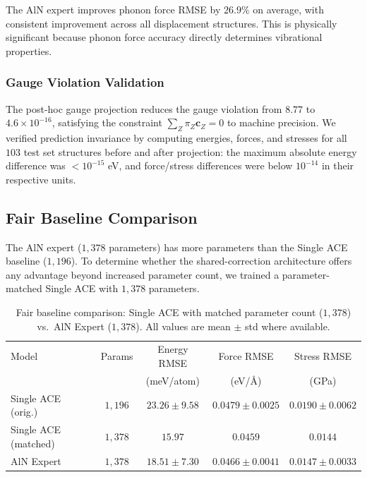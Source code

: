 \documentclass[twoside,prb,aps,floatfix,superscriptaddress,longbibliography]{revtex4-2}
\newcommand{\AAng}{\mbox{\AA}}
\newcommand{\cZ}{\mathbf{c}_{Z}}
\begin{document}
The AlN expert improves phonon force RMSE by $26.9\%$ on average, with consistent improvement across all displacement structures. This is physically significant because phonon force accuracy directly determines vibrational properties.

\subsubsection{Gauge Violation Validation}

The post-hoc gauge projection reduces the gauge violation from $8.77$ to $4.6 \times 10^{-16}$, satisfying the constraint $\sum_Z \pi_Z \cZ = 0$ to machine precision. We verified prediction invariance by computing energies, forces, and stresses for all $103$ test set structures before and after projection: the maximum absolute energy difference was $< 10^{-15}$ eV, and force/stress differences were below $10^{-14}$ in their respective units.

\subsection{Fair Baseline Comparison}
\label{sec:fair_baseline}

The AlN expert ($1{,}378$ parameters) has more parameters than the Single ACE baseline ($1{,}196$). To determine whether the shared-correction architecture offers any advantage beyond increased parameter count, we trained a parameter-matched Single ACE with $1{,}378$ parameters.

\begin{table}[t]
\caption{Fair baseline comparison: Single ACE with matched parameter count ($1{,}378$) vs.\ AlN Expert ($1{,}378$). All values are mean $\pm$ std where available.}
\label{tab:fair_baseline}
\begin{ruledtabular}
\begin{tabular}{lcccc}
\toprule
Model & Params & Energy RMSE & Force RMSE & Stress RMSE \\
 & & (meV/atom) & (eV/\AAng) & (GPa) \\
\midrule
Single ACE (orig.) & $1{,}196$ & $23.26 \pm 9.58$ & $0.0479 \pm 0.0025$ & $0.0190 \pm 0.0062$ \\
Single ACE (matched) & $1{,}378$ & $15.97$ & $0.0459$ & $0.0144$ \\
AlN Expert & $1{,}378$ & $18.51 \pm 7.30$ & $0.0466 \pm 0.0041$ & $0.0147 \pm 0.0033$ \\
\bottomrule
\end{tabular}
\end{ruledtabular}
\end{table}
\end{document}
